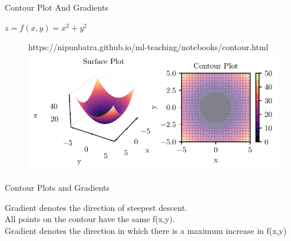 \documentclass{beamer}
\begin{document}
\begin{frame}{Contour Plot And Gradients}

$z = f(x,y) = x^{2} + y^{2}$\\

\begin{figure}[htp]
	\centering
	\begin{notebookbox}{https://nipunbatra.github.io/ml-teaching/notebooks/contour.html}
	  \includegraphics[width=\linewidth]{../assets/mathematical-ml/figures/contour-x_squared_plus_y_squared-with-gradient.pdf}
	\end{notebookbox}
  \end{figure}


\end{frame}








\begin{frame}{Contour Plots and Gradients}
    
    Gradient denotes the direction of steepest descent.\\
    All points on the contour have the same f(x,y).\\
    Gradient denotes the direction in which there is a maximum increase in f(x,y)\\

    
    
\end{frame}
\end{document}
